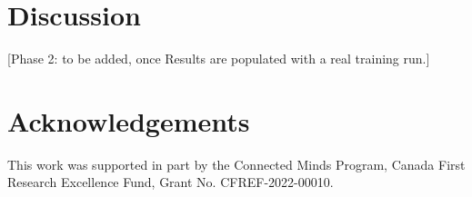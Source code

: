 \documentclass[11pt]{article}
\begin{document}
\section{Discussion}

[Phase 2: to be added, once Results are populated with a real training run.]

\section*{Acknowledgements}

This work was supported in part by the Connected Minds Program, Canada First Research Excellence Fund, Grant No. CFREF-2022-00010.


\end{document}
